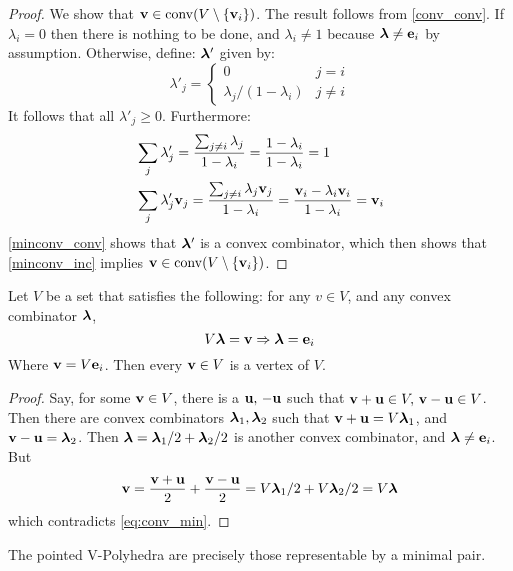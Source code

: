 \begin{proof}
	We show that $\mathbf{v}\in\operatorname{conv}(V\setminus\left\{\mathbf{v}_i\right\})$.  The result follows from \cref{conv_conv}.  If $\lambda_i = 0$ then there is nothing to be done, and $\lambda_i \neq 1$ because $\bm{\lambda} \neq \mathbf{e}_i$ by assumption.  Otherwise, define: $\bm{\lambda}'$ given by:
	\[ \lambda'_j =
		\begin{cases} 0 & j = i \\ \lambda_j/(1-\lambda_i) & j \neq i \end{cases} \]
	It follows that all $\lambda'_j \geq 0$.  Furthermore:
	\begin{align}
		 & \sum_j \lambda'_j = \frac{\sum_{j\neq i} \lambda_j}{1-\lambda_i}
		= \frac{1 - \lambda_i}{1-\lambda_i} = 1 \label{minconv_conv}                \\
		 & \sum_j \lambda'_j\mathbf{v}_j = \frac{\sum_{j\neq i} \lambda_j\mathbf{v}_j}{1-\lambda_i}
		= \frac{\mathbf{v}_i - \lambda_i\mathbf{v}_i}{1-\lambda_i} = \mathbf{v}_i \label{minconv_inc}
	\end{align}
	\eqref{minconv_conv} shows that $\bm{\lambda}'$ is a convex combinator, which then shows that \eqref{minconv_inc} implies ${\mathbf{v}\in\operatorname{conv}(V\setminus\left\{\mathbf{v}_i\right\})}$.
\end{proof}

\begin{Prop}\label{min_conv}
  Let $V$ be a set that satisfies the following: for any $v\in V$, and any convex combinator $\bm{\lambda}$,
  \begin{equation} V\bm{\lambda} = \mathbf{v} \Rightarrow \bm{\lambda} = \mathbf{e}_i \label{eq:conv_min}\end{equation}
  Where $\mathbf{v}=V\mathbf{e}_i$.  Then every $\mathbf{v}\in V$ is a vertex of $V$.
\end{Prop}

\begin{proof}
  Say, for some $\mathbf{v}\in V$, there is a $\mathbf{u},\,-\mathbf{u}$ such that $\mathbf{v}+\mathbf{u}\in V,\, \mathbf{v}-\mathbf{u}\in V$.  Then there are convex combinators $\bm{\lambda}_1,\bm{\lambda}_2$ such that $\mathbf{v}+\mathbf{u}=V\bm{\lambda}_1$, and $\mathbf{v}-\mathbf{u}=\bm{\lambda}_2$.  Then $\bm{\lambda} = \bm{\lambda}_1/2 + \bm{\lambda}_2/2$ is another convex combinator, and $\bm{\lambda} \neq \mathbf{e}_i$.  But 
    \[\mathbf{v} = \frac{\mathbf{v}+\mathbf{u}}{2} + \frac{\mathbf{v}-\mathbf{u}}{2} = V\bm{\lambda}_1/2 + V\bm{\lambda}_2/2 = V\bm{\lambda} \]
    which contradicts \eqref{eq:conv_min}.
\end{proof}

\begin{Prop}
	The pointed V-Polyhedra are precisely those representable by a minimal pair.
\end{Prop}

